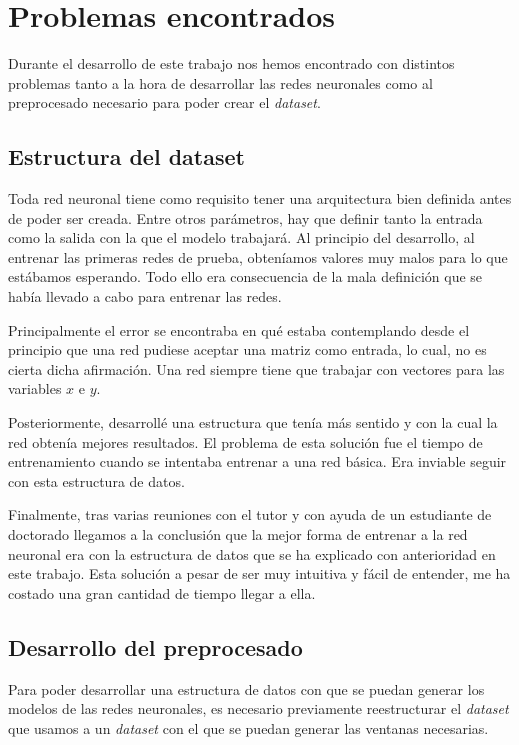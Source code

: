 \section{Problemas encontrados}

Durante el desarrollo de este trabajo nos hemos encontrado con distintos problemas tanto a la hora de desarrollar las redes neuronales como al preprocesado necesario para poder crear el \textit{dataset}.

\subsection{Estructura del dataset}
Toda red neuronal tiene como requisito tener una arquitectura bien definida antes de poder ser creada. Entre otros parámetros, hay que definir tanto la entrada como la salida con la que el modelo trabajará. Al principio del desarrollo, al entrenar las primeras redes de prueba, obteníamos valores muy malos para lo que estábamos esperando. Todo ello era consecuencia de la mala definición que se había llevado a cabo para entrenar las redes.
\newline

Principalmente el error se encontraba en qué estaba contemplando desde el principio que una red pudiese aceptar una matriz como entrada, lo cual, no es cierta dicha afirmación. Una red siempre tiene que trabajar con vectores para las variables $x$ e $y$.
\newline

Posteriormente, desarrollé una estructura que tenía más sentido y con la cual la red obtenía mejores resultados. El problema de esta solución fue el tiempo de entrenamiento cuando se intentaba entrenar a una red básica. Era inviable seguir con esta estructura de datos.
\newline

Finalmente, tras varias reuniones con el tutor y con ayuda de un estudiante de doctorado llegamos a la conclusión que la mejor forma de entrenar a la red neuronal era con la estructura de datos que se ha explicado con anterioridad en este trabajo. Esta solución a pesar de ser muy intuitiva y fácil de entender, me ha costado una gran cantidad de tiempo llegar a ella.


\subsection{Desarrollo del preprocesado}
Para poder desarrollar una estructura de datos con que se puedan generar los modelos de las redes neuronales, es necesario previamente reestructurar el \textit{dataset} que usamos a un \textit{dataset} con el que se puedan generar las ventanas necesarias.
\newline

